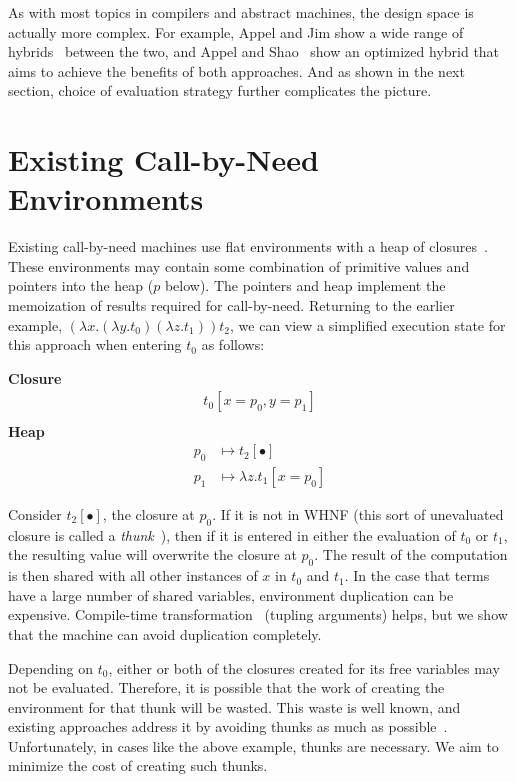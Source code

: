 As with most topics in compilers and abstract machines, the design space is
actually more complex. For example, Appel and Jim show a wide range of
hybrids~\cite{appel1988optimizing} between the two, and Appel and
Shao~\cite{shao1994space} show an optimized hybrid that aims to achieve the
benefits of both approaches. And as shown in the next section, choice of
evaluation strategy further complicates the picture.

\section{Existing Call-by-Need Environments} \label{sec:exist}

Existing call-by-need machines use flat environments with a heap of
closures~\cite{jonesstg,TIM,johnsson1984efficient,boquist1997grin}. These
environments may contain some combination of primitive values and pointers into the
heap ($p$ below). The pointers and heap implement the memoization of results
required for call-by-need. Returning to the earlier example, $(\lambda
x.(\lambda y.t_0) (\lambda z.t_1)) t_2$, we can view a simplified execution state
for this approach when entering $t_0$ as follows:

\begin{center}
\textbf{Closure}
\begin{align*}
t_0[x=p_0, y=p_1] \\
\end{align*}
\textbf{Heap}
\begin{align*}
p_0 &\mapsto t_2[\bullet] \\
p_1 &\mapsto \lambda z.t_1[x=p_0] 
\end{align*}
\end{center}

Consider $t_2[\bullet]$, the closure at $p_0$. If it is not in WHNF (this sort
of unevaluated closure is called a
\emph{thunk}~\cite{ingerman1961way,peyton1992implementing}), then if it is
entered in either the evaluation of $t_0$ or $t_1$, the resulting value will
overwrite the closure at $p_0$. The result of the computation is then shared
with all other instances of $x$ in $t_0$ and $t_1$. In the case that terms have a
large number of shared variables, environment duplication can be expensive.
Compile-time transformation~\cite{peyton1992implementing} (tupling arguments)
helps, but we show that the machine can avoid duplication completely.

Depending on $t_0$, either or both of the closures created for its free variables
may not be evaluated. Therefore, it is possible that the work of creating the
environment for that thunk will be wasted. This waste is well known, and
existing approaches address it by avoiding thunks as much as
possible~\cite{jonesstg,johnsson1984efficient}. Unfortunately, in cases like the
above example, thunks are necessary. We aim to minimize the cost of creating
such thunks.

